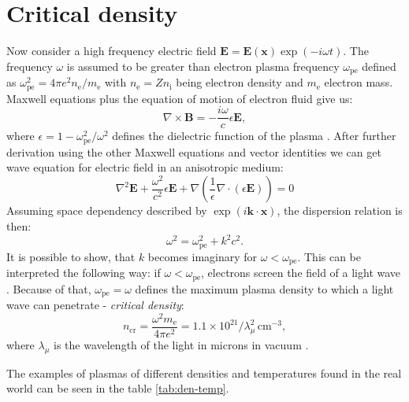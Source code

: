 \section{Critical density}
Now consider a high frequency electric field $\bm{E} = \bm{E(x)}\exp\left(-i\omega t\right)$. The frequency $\omega$ is assumed to be greater than electron plasma frequency $\omega_{\mathrm{pe}}$ defined as $\omega_{\mathrm{pe}}^2=4\pi e^2 n_\mathrm{e}/m_\mathrm{e}$ with $n_\mathrm{e}=Zn_{\mathrm{i}}$ being electron density and $m_\mathrm{e}$ electron mass. Maxwell equations plus the equation of motion of electron fluid give us:
\begin{equation}
	\nabla \times \bm{B} = -\frac{i\omega}{c}\epsilon\bm{E},
\end{equation}
where $\epsilon = 1 - \omega_{\mathrm{pe}}^2/\omega^2$ defines the dielectric function of the plasma \cite{laser-plasma4}. After further derivation using the other Maxwell equations and vector identities we can get wave equation for electric field in an anisotropic medium:
\begin{equation}
	\nabla^2 \bm{E} + \frac{\omega^2}{c^2}\epsilon\bm{E} + \nabla\left(\frac{1}{\epsilon}\nabla \cdot \left(\epsilon\bm{E}\right)\right) = 0
\end{equation}
Assuming space dependency described by $\exp\left(i\bm{k}\cdot\bm{x}\right)$, the dispersion relation is then:
\begin{equation}
	\omega^2 = \omega_{\mathrm{pe}}^2 + k^2c^2.
\end{equation}
It is possible to show, that $k$ becomes imaginary for $\omega < \omega_{\mathrm{pe}}$. This can be interpreted the following way: if $\omega < \omega_{\mathrm{pe}}$, electrons screen the field of a light wave . Because of that, $\omega_{\mathrm{pe}}=\omega$ defines the maximum plasma density to which a light wave can penetrate - \textit{critical density}:
\begin{equation}
	n_{\mathrm{cr}} = \frac{\omega^2 m_\mathrm{e}}{4 \pi e^2} = 1.1 \times 10^{21} / \lambda_\mu^2 \, \mathrm{cm}^{-3}, 
\end{equation}
where  $\lambda_\mu$ is the wavelength of the light in microns in vacuum \cite{laser-plasma4}.

The examples of plasmas of different densities and temperatures found in the real world can be seen in the table \ref{tab:den-temp}.


